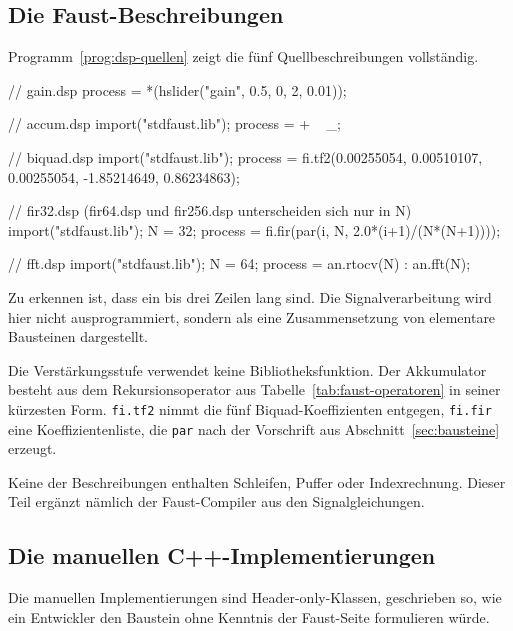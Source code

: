 \subsection{Die Faust-Beschreibungen}
\label{subsec:faust-seite}

Programm~\ref{prog:dsp-quellen} zeigt die fünf Quellbeschreibungen vollständig.

\begin{program}[b]
	\caption{Die fünf Faust-Quellbeschreibungen}
	\label{prog:dsp-quellen}
	\begin{CCode}
		// gain.dsp
		process = *(hslider("gain", 0.5, 0, 2, 0.01));
		
		// accum.dsp
		import("stdfaust.lib");
		process = + ~ _;
		
		// biquad.dsp
		import("stdfaust.lib");
		process = fi.tf2(0.00255054, 0.00510107, 0.00255054,
		-1.85214649, 0.86234863);
		
		// fir32.dsp  (fir64.dsp und fir256.dsp unterscheiden sich nur in N)
		import("stdfaust.lib");
		N = 32;
		process = fi.fir(par(i, N, 2.0*(i+1)/(N*(N+1))));
		
		// fft.dsp
		import("stdfaust.lib");
		N = 64;
		process = an.rtocv(N) : an.fft(N);
	\end{CCode}
\end{program}

Zu erkennen ist, dass ein bis drei Zeilen lang sind. Die Signalverarbeitung wird hier nicht ausprogrammiert, sondern als eine Zusammensetzung von elementare Bausteinen dargestellt.


Die Verstärkungsstufe verwendet keine Bibliotheksfunktion. 
Der Akkumulator besteht aus dem Rekursionsoperator aus Tabelle~\ref{tab:faust-operatoren} in seiner kürzesten Form. \texttt{fi.tf2} nimmt die fünf Biquad-Koeffizienten entgegen, \texttt{fi.fir} eine Koeffizientenliste, die \texttt{par} nach der Vorschrift aus Abschnitt~\ref{sec:bausteine} erzeugt.

Keine der Beschreibungen enthalten Schleifen, Puffer oder Indexrechnung. Dieser Teil ergänzt nämlich der Faust-Compiler aus den Signalgleichungen.

\subsection{Die manuellen C++-Implementierungen}
\label{subsec:cpp-seite}

Die manuellen Implementierungen sind Header-only-Klassen, geschrieben so, wie ein Entwickler den Baustein ohne Kenntnis der Faust-Seite formulieren würde.

